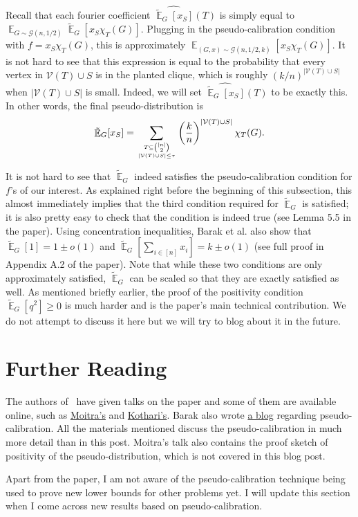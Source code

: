 \documentclass{article}[11pt]
\newcommand{\cG}{\mathcal{G}}
\newcommand{\cV}{\mathcal{V}}
\newcommand{\E}{\mathop{\mathbb{E}}}
\newcommand{\tE}{\tilde{\E}}
\newcounter{section-preserve}
\begin{document}
Recall that each fourier coefficient $\widehat{\tE_G[x_S]}(T)$ is simply equal to $\E_{G \sim \cG(n, 1/2)} \tE_G[x_S \chi_T(G)].$ Plugging in the pseudo-calibration condition with $f = x_S\chi_T(G)$, this is approximately $\E_{(G, x) \sim \cG(n, 1/2, k)} [x_S\chi_T(G)]$. It is not hard to see that this expression is equal to the probability that every vertex in $\cV(T) \cup S$ is in the planted clique, which is roughly $(k/n)^{|\cV(T) \cup S|}$ when $|\cV(T) \cup S|$ is small. Indeed, we will set $\widehat{\tE_G[x_S]}(T)$ to be exactly this. In other words, the final pseudo-distribution is
\begin{align*}
\tE_G[x_S] = \sum_{T \subseteq {[n] \choose 2} \atop |\cV(T) \cup S| \leq \tau} \left(\frac{k}{n}\right)^{|\cV(T) \cup S|} \chi_T(G).
\end{align*}

It is not hard to see that $\tE_G$ indeed satisfies the pseudo-calibration condition for $f$'s of our interest. As explained right before the beginning of this subsection, this almost immediately implies that the third condition required for $\tE_G$ is satisfied; it is also pretty easy to check that the condition is indeed true (see Lemma 5.5 in the paper). Using concentration inequalities, Barak et al. also show that $\tE_G[1] = 1 \pm o(1)$ and $\tE_G[\sum_{i \in [n]} x_i] = k \pm o(1)$ (see full proof in Appendix A.2 of the paper). Note that while these two conditions are only approximately satisfied, $\tE_G$ can be scaled so that they are exactly satisfied as well. As mentioned briefly earlier, the proof of the positivity condition $\tE_G[q^2] \geq 0$ is much harder and is the paper's main technical contribution. We do not attempt to discuss it here but we will try to blog about it in the future.

\section{Further Reading}

The authors of~\cite{BHKKMP16} have given talks on the paper and some of them are available online, such as \href{https://www.youtube.com/watch?v=ZmFOsAB7Y1k}{Moitra's} and \href{https://www.youtube.com/watch?v=H2C2ZdgynX4}{Kothari's}. Barak also wrote \href{https://windowsontheory.org/2016/04/13/bayesianism-frequentism-and-the-planted-clique-or-do-algorithms-believe-in-unicorns/}{a blog} regarding pseudo-calibration. All the materials mentioned discuss the pseudo-calibration in much more detail than in this post. Moitra's talk also contains the proof sketch of positivity of the pseudo-distribution, which is not covered in this blog post.

Apart from the paper, I am not aware of the pseudo-calibration technique being used to prove new lower bounds for other problems yet. I will update this section when I come across new results based on pseudo-calibration.



\end{document}
